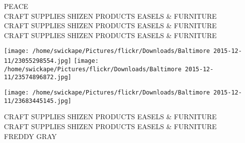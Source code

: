 \documentclass[10pt,letterpaper]{article}
\begin{document}
PEACE\\
CRAFT SUPPLIES SHIZEN PRODUCTS EASELS \& FURNITURE\\
CRAFT SUPPLIES SHIZEN PRODUCTS EASELS \& FURNITURE\\
CRAFT SUPPLIES SHIZEN PRODUCTS EASELS \& FURNITURE
\pagebreak

\texttt{[image: /home/swickape/Pictures/flickr/Downloads/Baltimore 2015-12-11/23055298554.jpg]}
\texttt{[image: /home/swickape/Pictures/flickr/Downloads/Baltimore 2015-12-11/23574896872.jpg]}

\vspace{0.25in}
\texttt{[image: /home/swickape/Pictures/flickr/Downloads/Baltimore 2015-12-11/23683445145.jpg]}

CRAFT SUPPLIES SHIZEN PRODUCTS EASELS \& FURNITURE\\
CRAFT SUPPLIES SHIZEN PRODUCTS EASELS \& FURNITURE\\
FREDDY GRAY
\pagebreak
\end{document}
